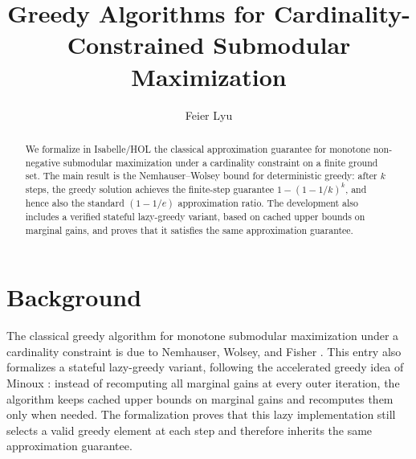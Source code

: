 \documentclass[11pt,a4paper]{article}
\begin{document}
\title{Greedy Algorithms for Cardinality-Constrained Submodular Maximization}
\author{Feier Lyu}
\maketitle

\begin{abstract}
We formalize in Isabelle/HOL the classical approximation guarantee for monotone
non-negative submodular maximization under a cardinality constraint on a finite
ground set. The main result is the Nemhauser--Wolsey bound for deterministic
greedy: after $k$ steps, the greedy solution achieves the finite-step guarantee
$1 - (1 - 1/k)^k$, and hence also the standard $(1 - 1/e)$ approximation ratio.
The development also includes a verified stateful lazy-greedy variant, based on
cached upper bounds on marginal gains, and proves that it satisfies the same
approximation guarantee.
\end{abstract}

\tableofcontents

\section*{Background}

The classical greedy algorithm for monotone submodular maximization under a
cardinality constraint is due to Nemhauser, Wolsey, and Fisher
\cite{NemhauserWolseyFisher1978}.  This entry also formalizes a stateful
lazy-greedy variant, following the accelerated greedy idea of Minoux
\cite{Minoux1978}: instead of recomputing all marginal gains at every outer
iteration, the algorithm keeps cached upper bounds on marginal gains and
recomputes them only when needed.  The formalization proves that this lazy
implementation still selects a valid greedy element at each step and therefore
inherits the same approximation guarantee.



\nocite{NemhauserWolseyFisher1978}
\nocite{Minoux1978}



\end{document}
